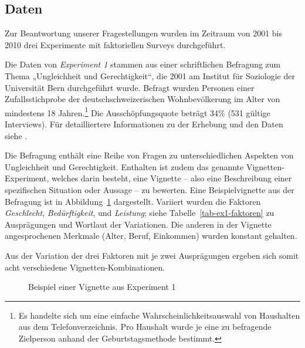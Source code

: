 \documentclass[a4paper,12pt]{article}
\begin{document}
\subsection{Daten}
\label{sec:ss6}

Zur Beantwortung unserer Fragestellungen wurden im Zeitraum von 2001 bis 2010 drei Experimente mit faktoriellen Surveys durchgeführt.

Die Daten von \emph{Experiment 1} stammen aus einer schriftlichen Befragung zum Thema „Ungleichheit und
Gerechtigkeit“, die 2001 am Institut für Soziologie der Universität Bern
durchgeführt wurde. Befragt wurden Personen einer Zufallsstichprobe der
deutschschweizerischen Wohnbevölkerung im Alter von mindestens 18
Jahren.\footnote{Es handelte sich um eine einfache Wahrscheinlichkeitsauswahl
von Haushalten aus dem Telefonverzeichnis. Pro Haushalt wurde je eine zu
befragende Zielperson anhand der Geburtstagsmethode bestimmt.} Die
Ausschöpfungsquote beträgt 34\% (531 gültige Interviews). Für detailliertere
Informationen zu der Erhebung und den Daten siehe \citet{Jann-2001}.

Die Befragung enthält eine Reihe von Fragen zu unterschiedlichen Aspekten von
Ungleichheit und Gerechtigkeit. Enthalten ist zudem das genannte Vignetten-Experiment,
welches darin besteht, eine Vignette -- also eine Beschreibung einer
spezifischen Situation oder Aussage -- zu bewerten. Eine Beispielvignette aus
der Befragung ist in Abbildung~\ref{fig-1} dargestellt. Variiert wurden die
Faktoren \emph{Geschlecht}, \emph{Bedürftigkeit}, und \emph{Leistung}; siehe 
Tabelle~\ref{tab-ex1-faktoren} zu Ausprägungen und Wortlaut der Variationen.
Die anderen in der Vignette angesprochenen Merkmale (Alter, Beruf, Einkommen)
wurden konstant gehalten.

Aus der Variation der drei Faktoren mit je zwei Ausprägungen ergeben sich somit acht
verschiedene Vignetten-Kombinationen. 

\begin{figure}\centering
    \caption{Beispiel einer Vignette aus Experiment 1}\label{fig-1}
\end{figure}
\end{document}
